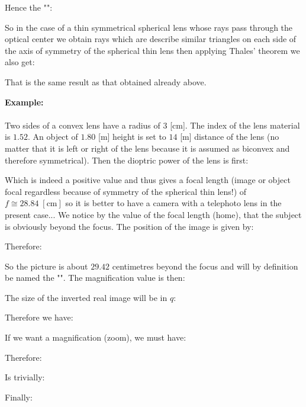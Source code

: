 	Hence the "":
	
	So in the case of a thin symmetrical spherical lens whose rays pass through the optical center we obtain rays which are describe similar triangles on each side of the axis of symmetry of the spherical thin lens then applying Thales' theorem we also get:
	
	That is the same result as that obtained already above.
	\begin{tcolorbox}[colframe=black,colback=white,sharp corners]
	\textbf{{\Large {}}Example:}\\\\
	Two sides of a convex lens have a radius of $3$ [cm]. The index of the lens material is $1.52$. An object of $1.80$ [m] height is set to $14$ [m] distance of the lens (no matter that it is left or right of the lens because it is assumed as biconvex and therefore symmetrical). Then the dioptric power of the lens is first:
	
	Which is indeed a positive value and thus gives a focal length (image or object focal regardless because of symmetry of the spherical thin lens!) of	$f\cong 28.84\;[\text{cm}]$ so it is better to have a camera with a telephoto lens in the present case... We notice by the value of the focal length (home), that the subject is obviously beyond the focus. The position of the image is given by:
	
	Therefore:
	
	So the picture is about $29.42$ centimetres beyond the focus and will by definition be named the "". The magnification value is then:
	
	The size of the inverted real image will be in $q$:
	
	\end{tcolorbox}
	Therefore we have:
	
	If we want a magnification (zoom), we must have:
	
	Therefore:
		
	Is trivially:
	
	Finally:
	
